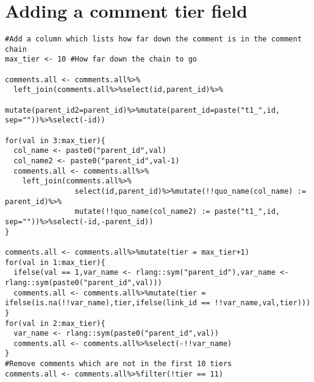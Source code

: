 \section{Adding a comment tier field}
\label{sec:AppendexA1}
\begin{lstlisting}
#Add a column which lists how far down the comment is in the comment chain
max_tier <- 10 #How far down the chain to go

comments.all <- comments.all%>%
  left_join(comments.all%>%select(id,parent_id)%>%
              mutate(parent_id2=parent_id)%>%mutate(parent_id=paste("t1_",id, sep=""))%>%select(-id))

for(val in 3:max_tier){
  col_name <- paste0("parent_id",val)
  col_name2 <- paste0("parent_id",val-1)
  comments.all <- comments.all%>%
    left_join(comments.all%>%
                select(id,parent_id)%>%mutate(!!quo_name(col_name) := parent_id)%>%
                mutate(!!quo_name(col_name2) := paste("t1_",id, sep=""))%>%select(-id,-parent_id))
}

comments.all <- comments.all%>%mutate(tier = max_tier+1)
for(val in 1:max_tier){
  ifelse(val == 1,var_name <- rlang::sym("parent_id"),var_name <- rlang::sym(paste0("parent_id",val)))
  comments.all <- comments.all%>%mutate(tier = ifelse(is.na(!!var_name),tier,ifelse(link_id == !!var_name,val,tier)))
}
for(val in 2:max_tier){
  var_name <- rlang::sym(paste0("parent_id",val))
  comments.all <- comments.all%>%select(-!!var_name)
}
#Remove comments which are not in the first 10 tiers
comments.all <- comments.all%>%filter(!tier == 11)
\end{lstlisting}

